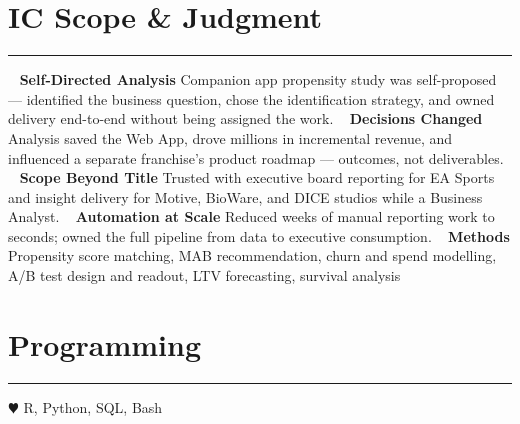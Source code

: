 %
%

\vspace{-1.0cm}
\section{\LARGE IC Scope \& Judgment}
\noindent\rule{\textwidth}{0.4pt}
\vspace{-0.2cm}
~
\textbf{\large Self-Directed Analysis}
\faGem Companion app propensity study was self-proposed — identified the business question, chose the identification strategy, and owned delivery end-to-end without being assigned the work.
~
\textbf{\large Decisions Changed}
\faGem Analysis saved the Web App, drove millions in incremental revenue, and influenced a separate franchise's product roadmap — outcomes, not deliverables.
~
\textbf{\large Scope Beyond Title}
\faGem Trusted with executive board reporting for EA Sports and insight delivery for Motive, BioWare, and DICE studios while a Business Analyst.
~
\textbf{\large Automation at Scale}
\faGem Reduced weeks of manual reporting work to seconds; owned the full pipeline from data to executive consumption.
~
\textbf{\large Methods}
Propensity score matching, MAB recommendation, churn and spend modelling, A/B test design and readout, LTV forecasting, survival analysis
\section{\LARGE Programming}
\noindent\rule{\textwidth}{0.4pt}
{\color{red} $\varheartsuit$} R, Python, SQL, Bash
